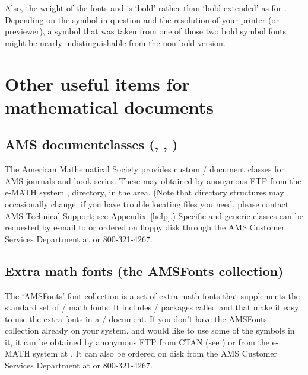 \documentclass[leqno,titlepage,openany]{amsldoc}
\begin{document}
Also, the weight of the fonts  and  is `bold'
rather than `bold extended' as for . Depending on the symbol
in question and the resolution of your printer (or previewer), a
symbol that was taken from one of those two bold symbol fonts might
be nearly indistinguishable from the non-bold version.


\chapter{Other useful items for mathematical documents}

\section{AMS documentclasses (, ,
)}

The American Mathematical Society provides custom \amslatex/ document
classes for AMS journals and book series. These may obtained by
anonymous FTP from the e-MATH system , directory, in
the  area. (Note that directory structures may
occasionally change; if you have trouble locating files you need, please
contact AMS Technical Support; see Appendix~\ref{help}.) Specific and
generic classes can be requested by e-mail to
 or ordered on floppy disk through the AMS
Customer Services Department at  or
800-321-4267.

\section{Extra math fonts (the AMSFonts collection)}
\label{amsfonts}

The `AMSFonts' font collection is a set of extra math fonts that supplements the standard set of \latex/ math
fonts. It includes \latex/ packages called  and
 that make it easy to use the extra fonts in a \latex/
document. If you don't have the AMSFonts collection already on your
system, and would like to use some of the symbols in it, it can be
obtained by anonymous FTP from CTAN (see
) or from the e-MATH system at . It can
also be ordered on disk from the AMS Customer Services Department at
 or 800-321-4267.
\end{document}
